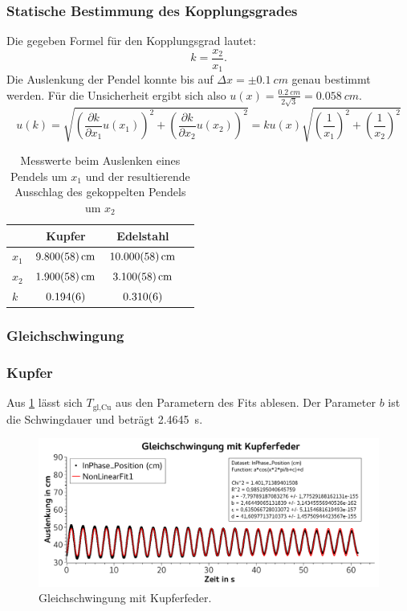 \documentclass[
	a4paper,
	12pt,
	pagesize,
	ngerman
]{scrartcl}
\begin{document}
	\subsubsection{Statische Bestimmung des Kopplungsgrades}
	Die gegeben Formel für den Kopplungsgrad lautet:
	\begin{equation}
		k = \frac{x_2}{x_1}.
	\end{equation}
	Die Auslenkung der Pendel konnte bis auf $\Delta x = \pm \SI{0,1}{cm}$ genau bestimmt werden.
	Für die Unsicherheit ergibt sich also $u(x) = \frac{\SI{0,2}{cm}}{2\sqrt{3}} = \SI{0,058}{cm}$.
	\begin{equation}
		u(k) = \sqrt{\left(\frac{\partial k}{\partial x_1}u(x_1)\right)^2+\left(\frac{\partial k}{\partial x_2}u(x_2)\right)^2} = k u(x) \sqrt{\left(\frac{1}{x_1}\right)^2+\left(\frac{1}{x_2}\right)^2}
	\end{equation}
	\begin{table}[H]
	\centering
	\begin{tabular}{ l | c | c | c |}
		& Kupfer & Edelstahl  \\ \hline
		$x_1 $ &$\SI{9,8 \pm 0,058}{cm}$&$\SI{10,0 \pm 0,058}{cm}$\\  
		$x_2 $ &$\SI{1,9 \pm 0,058}{cm}$&$\SI{3,1 \pm 0,058}{cm}$\\  \hline\hline
		$k$  & $\SI{0,194 \pm 0,006}{}$ &  $\SI{0,310 \pm 0,006}{}$ \\ \hline
	\end{tabular}
	\caption{Messwerte beim Auslenken eines Pendels um $x_1$ und der resultierende Ausschlag des gekoppelten Pendels um $x_2$}
	\end{table}

	\subsubsection{Gleichschwingung}

	\subsubsection*{Kupfer}
	Aus \cref{KupferGleichschwingung} lässt sich $T_\text{gl,Cu}$ aus den Parametern des Fits ablesen. Der Parameter $b$ ist die Schwingdauer und beträgt \SI{2,4645}{s}.
	\begin{figure}[H]
		\includegraphics[width=1\textwidth]{KupferGleichschwingung}
		\centering
		\caption{Gleichschwingung mit Kupferfeder.}
		\label{KupferGleichschwingung}
		\centering
	\end{figure}
\end{document}

